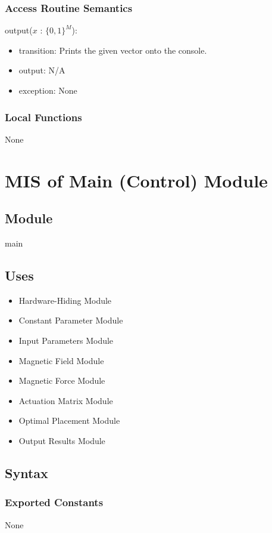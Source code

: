 \documentclass[12pt, titlepage]{article}
\begin{document}
\subsubsection{Access Routine Semantics}

\noindent output($x$ : $\{0,1\}^M$):
\begin{itemize}
\item transition: Prints the given vector onto the console. 
\item output: N/A 
\item exception: None
\end{itemize}

\subsubsection{Local Functions}
None 
\newpage

\section{MIS of Main (Control) Module} \label{MISControl}

\subsection{Module}
main 

\subsection{Uses}
\begin{itemize}
  \item Hardware-Hiding Module 
  \item Constant Parameter Module 
  \item Input Parameters Module 
  \item Magnetic Field Module 
  \item Magnetic Force Module 
  \item Actuation Matrix Module 
  \item Optimal Placement Module 
  \item Output Results Module 
\end{itemize}

\subsection{Syntax}

\subsubsection{Exported Constants}
None 
\end{document}

